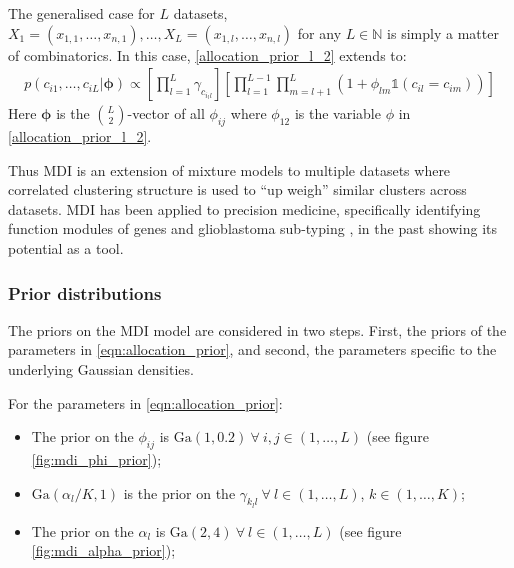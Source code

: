 \documentclass[12pt]{article} %
\begin{document}
	The generalised case for $L$ datasets, $X_1 = (x_{1,1},\ldots,x_{n,1}),\ldots, X_L = (x_{1,l},\ldots,x_{n,l})$ for any $L \in \mathbb{N}$ is simply a matter of combinatorics. In this case, \eqref{allocation_prior_l_2} extends to:
	\begin{align} \label{eqn:allocation_prior}
	p(c_{i1},\ldots,c_{iL} | \boldsymbol{\phi}) \propto \left[\prod_{l=1}^L\gamma_{c_{i_ll}} \right]\left[\prod_{l=1}^{L-1}\prod_{m=l+1}^L\left(1+\phi_{lm}\mathbb{1}(c_{il} = c_{im}) \right)\right]
	\end{align}
	Here $\boldsymbol{\phi}$ is the ${L \choose 2}$-vector of all $\phi_{ij}$ where $\phi_{12}$ is the variable $\phi$ in \eqref{allocation_prior_l_2}.

	Thus MDI is an extension of mixture models to multiple datasets where correlated clustering structure is used to ``up weigh'' similar clusters across datasets. MDI has been applied to precision medicine, specifically identifying function modules of genes and glioblastoma sub-typing \citep{SavageIdentifyingcancersubtypes2013a}, in the past showing its potential as a tool.
	
	\subsubsection{Prior distributions}
	The priors on the MDI model are considered in two steps. First, the priors of the parameters in \eqref{eqn:allocation_prior}, and second, the parameters specific to the underlying Gaussian densities.
	
	For the parameters in \eqref{eqn:allocation_prior}:
	\begin{itemize}
		\item The prior on the $\phi_{ij}$ is $\text{Ga}(1, 0.2) \: \forall \: i,j \in (1, \ldots, L)$ (see figure \ref{fig:mdi_phi_prior}); 
		\item $\text{Ga}(\alpha_l / K, 1)$ is the prior on the $\gamma_{k_ll}  \: \forall \: l \in (1, \ldots, L)$, $k \in (1,\ldots, K)$;
		\item The prior on the $\alpha_l$ is $\text{Ga}(2,4) \: \forall \: l \in (1,\ldots,L)$ (see figure \ref{fig:mdi_alpha_prior});
	\end{itemize}
\end{document}
